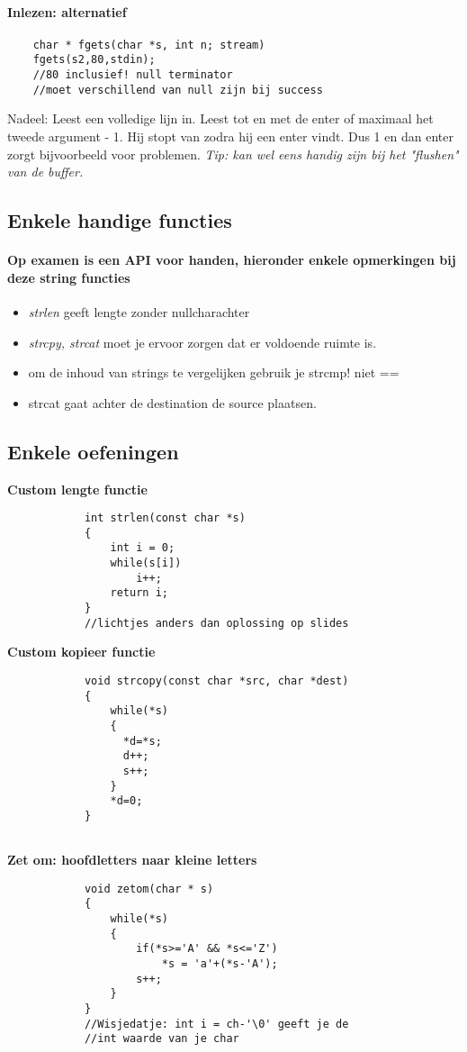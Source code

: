 \documentclass{article}
\begin{document}
 \paragraph{Inlezen: alternatief}
   \begin{lstlisting}
    char * fgets(char *s, int n; stream)
    fgets(s2,80,stdin);
    //80 inclusief! null terminator
    //moet verschillend van null zijn bij success
   \end{lstlisting}
   Nadeel: Leest een volledige lijn in. Leest tot en met de enter of maximaal het tweede argument - 1. Hij stopt van zodra hij een enter vindt. Dus 1 en dan enter zorgt bijvoorbeeld voor problemen.
   \newline\textit{Tip: kan wel eens handig zijn bij het "flushen" van de buffer.}
  \subsection{Enkele handige functies}
    \paragraph{Op examen is een API voor handen, hieronder enkele opmerkingen bij deze string functies}
    \begin{itemize}
        \item \textit{strlen} geeft lengte zonder nullcharachter
        \item \textit{strcpy, strcat} moet je ervoor zorgen dat er voldoende ruimte is.
        \item om de inhoud van strings te vergelijken gebruik je strcmp! niet ==
        \item strcat gaat achter de destination de source plaatsen.
    \end{itemize}
  \subsection{Enkele oefeningen}
    \textbf{Custom lengte functie}
        \begin{lstlisting}
            int strlen(const char *s)
            {
                int i = 0;
                while(s[i])
                    i++;
                return i;
            }
            //lichtjes anders dan oplossing op slides
        \end{lstlisting}
    \textbf{Custom kopieer functie}
        \begin{lstlisting}
            void strcopy(const char *src, char *dest)
            {
                while(*s)
                { 
                  *d=*s;
                  d++;
                  s++;
                }
                *d=0;   
            }      
            
        \end{lstlisting}
    \textbf{Zet om: hoofdletters naar kleine letters}
        \begin{lstlisting}
            void zetom(char * s)
            {
                while(*s)
                {
                    if(*s>='A' && *s<='Z')
                        *s = 'a'+(*s-'A');
                    s++;
                }
            }
            //Wisjedatje: int i = ch-'\0' geeft je de 
            //int waarde van je char
        \end{lstlisting}
\end{document}
